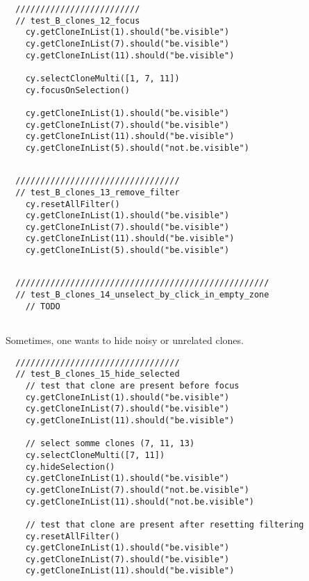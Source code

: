 \begin{verbatim}
  /////////////////////////
  // test_B_clones_12_focus
    cy.getCloneInList(1).should("be.visible")
    cy.getCloneInList(7).should("be.visible")
    cy.getCloneInList(11).should("be.visible")

    cy.selectCloneMulti([1, 7, 11])
    cy.focusOnSelection()

    cy.getCloneInList(1).should("be.visible")
    cy.getCloneInList(7).should("be.visible")
    cy.getCloneInList(11).should("be.visible")
    cy.getCloneInList(5).should("not.be.visible")


\end{verbatim}

\begin{verbatim}
  /////////////////////////////////
  // test_B_clones_13_remove_filter
    cy.resetAllFilter()
    cy.getCloneInList(1).should("be.visible")
    cy.getCloneInList(7).should("be.visible")
    cy.getCloneInList(11).should("be.visible")
    cy.getCloneInList(5).should("be.visible")


\end{verbatim}

\begin{verbatim}
  ///////////////////////////////////////////////////
  // test_B_clones_14_unselect_by_click_in_empty_zone
    // TODO


\end{verbatim}

Sometimes, one wants to hide noisy or unrelated clones.

\begin{verbatim}
  /////////////////////////////////
  // test_B_clones_15_hide_selected
    // test that clone are present before focus
    cy.getCloneInList(1).should("be.visible")
    cy.getCloneInList(7).should("be.visible")
    cy.getCloneInList(11).should("be.visible")

    // select somme clones (7, 11, 13)
    cy.selectCloneMulti([7, 11])
    cy.hideSelection()
    cy.getCloneInList(1).should("be.visible")
    cy.getCloneInList(7).should("not.be.visible")
    cy.getCloneInList(11).should("not.be.visible")
    
    // test that clone are present after resetting filtering
    cy.resetAllFilter()
    cy.getCloneInList(1).should("be.visible")
    cy.getCloneInList(7).should("be.visible")
    cy.getCloneInList(11).should("be.visible")


\end{verbatim}

